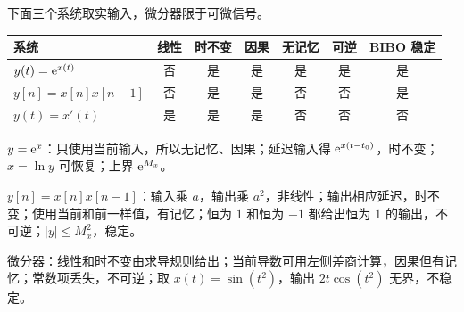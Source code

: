 \begin{example}
  下面三个系统取实输入，微分器限于可微信号。
  \begin{center}
    \small
    \begin{tabular}{lcccccc}
      \toprule
      系统&线性&时不变&因果&无记忆&可逆&BIBO 稳定\\
      \midrule
      $y(t)=\mathrm{e}^{x(t)}$&否&是&是&是&是&是\\
      $y[n]=x[n]x[n-1]$&否&是&是&否&否&是\\
      $y(t)=x'(t)$&是&是&是&否&否&否\\
      \bottomrule
    \end{tabular}
  \end{center}
  $y=\mathrm{e}^x$：只使用当前输入，所以无记忆、因果；延迟输入得 $\mathrm{e}^{x(t-t_0)}$，时不变；$x=\ln y$ 可恢复；上界 $\mathrm{e}^{M_x}$。

  $y[n]=x[n]x[n-1]$：输入乘 $a$，输出乘 $a^2$，非线性；输出相应延迟，时不变；使用当前和前一样值，有记忆；恒为 $1$ 和恒为 $-1$ 都给出恒为 $1$ 的输出，不可逆；$|y|\le M_x^2$，稳定。

  微分器：线性和时不变由求导规则给出；当前导数可用左侧差商计算，因果但有记忆；常数项丢失，不可逆；取 $x(t)=\sin(t^2)$，输出 $2t\cos(t^2)$ 无界，不稳定。
\end{example}
